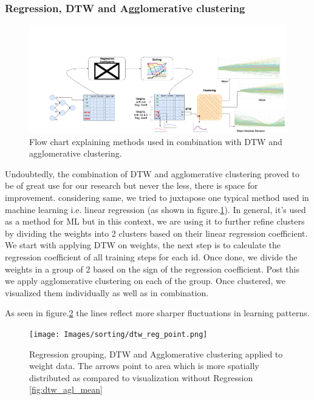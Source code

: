 \documentclass[journal]{vgtc}                %
\begin{document}
\subsubsection{Regression, DTW and Agglomerative clustering}
\begin{figure}
    \includegraphics[scale=0.24]{Images/flow_chart.png}
    \caption{Flow chart explaining methods used in combination with DTW and agglomerative clustering.}
    \label{fig:flow_chart}
\end{figure}



Undoubtedly, the combination of DTW and agglomerative clustering proved to be
of great use for our research but never the less, there is space for improvement.
considering same, we tried to juxtapose one typical method used in machine learning
i.e. linear regression (as shown in figure.\ref{fig:flow_chart}). In general, it's used as a method for ML but in this context, we are using it to further refine clusters by dividing the weights into 2 clusters based on their linear regression coefficient. 
We start with applying DTW on weights, the next step is to calculate
the regression coefficient of all training steps for each id. Once done, we divide the weights in a group of 2  based on the sign of the regression coefficient.
Post this we apply agglomerative clustering on each of the group. 
Once clustered, we visualized them individually as well as in combination.

As seen in figure.\ref{fig:reg_dtw_aggl} the lines reflect more sharper fluctuations in learning patterns.


\begin{figure}
    \texttt{[image: Images/sorting/dtw\_reg\_point.png]}
    \caption{Regression grouping, DTW and Agglomerative clustering applied to weight data. The arrows point to area which is more spatially distributed as compared to visualization without Regression \ref{fig:dtw_agl_mean}}
    \label{fig:reg_dtw_aggl}
\end{figure}
\end{document}
